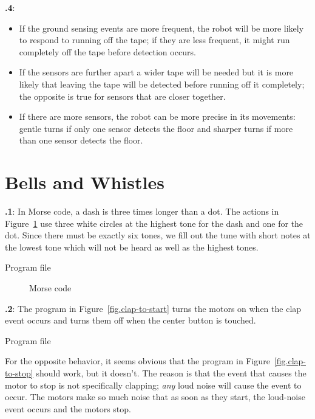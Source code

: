 \documentclass[12pt,a4paper,english]{article}
\begin{document}
\textbf{\thesection.4}:
\begin{itemize}
\item If the ground sensing events are more frequent, the robot will be
more likely to respond to running off the tape; if they are less
frequent, it might run completely off the tape before detection occurs.
\item If the sensors are further apart a wider tape will be needed but
it is more likely that leaving the tape will be detected before running
off it completely; the opposite is true for sensors that are closer
together.
\item If there are more sensors, the robot can be more precise in its
movements: gentle turns if only one sensor detects the floor and sharper
turns if more than one sensor detects the floor.
\end{itemize}

\section{Bells and Whistles}

\textbf{\thesection.1}:
In Morse code, a dash is three times longer than a dot. The actions in
Figure~\ref{fig.morse} use three white circles at the highest tone for the
dash and one for the dot. Since there must be exactly six tones, we fill
out the tune with short notes at the lowest tone which will not be heard
as well as the highest tones.

{\raggedleft \hfill Program file }

\begin{figure}
\begin{center}
\caption{Morse code}\label{fig.morse}
\end{center}
\end{figure}


\textbf{\thesection.2}: The program in Figure~\ref{fig.clap-to-start} turns the motors on when
the clap event occurs and turns them off when the center button is
touched.

{\raggedleft \hfill Program file }

For the opposite behavior, it seems obvious that the program in
Figure~\ref{fig.clap-to-stop} should work, but it doesn't. The reason is
that the event that causes the motor to stop is not specifically
clapping; \emph{any} loud noise will cause the event to occur. The
motors make so much noise that as soon as they start, the loud-noise
event occurs and the motors stop.
\end{document}
